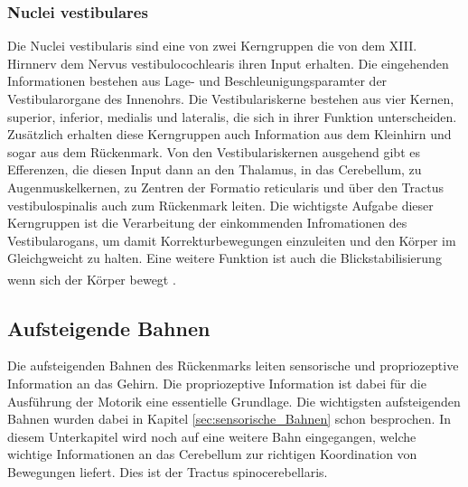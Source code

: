 \documentclass[12pt,a4paper,pdftex]{article}
\begin{document}
\subsubsection*{Nuclei vestibulares} 
Die Nuclei vestibularis sind eine von zwei Kerngruppen die von dem XIII. Hirnnerv dem Nervus vestibulocochlearis ihren Input erhalten. Die eingehenden Informationen bestehen aus Lage- und Beschleunigungsparamter der Vestibularorgane des Innenohrs. Die Vestibulariskerne bestehen aus vier Kernen, superior, inferior, medialis und lateralis, die sich in ihrer Funktion unterscheiden. Zusätzlich erhalten diese Kerngruppen auch Information aus dem Kleinhirn und sogar aus dem Rückenmark. Von den Vestibulariskernen ausgehend gibt es Efferenzen, die diesen Input dann an den Thalamus, in das Cerebellum, zu Augenmuskelkernen, zu Zentren der Formatio reticularis und über den Tractus vestibulospinalis auch zum Rückenmark leiten. Die wichtigste Aufgabe dieser Kerngruppen ist die Verarbeitung der einkommenden Infromationen des Vestibularogans, um damit Korrekturbewegungen einzuleiten und den Körper im Gleichgweicht zu halten. Eine weitere Funktion ist auch die Blickstabilisierung wenn sich der Körper bewegt \textsuperscript{\cite[5]{trepel2011neuroanatomie}}.  


\subsection{Aufsteigende Bahnen}
Die aufsteigenden Bahnen des Rückenmarks leiten sensorische und propriozeptive Information an das Gehirn. Die propriozeptive Information ist dabei für die Ausführung der Motorik eine essentielle Grundlage. Die wichtigsten aufsteigenden Bahnen wurden dabei in Kapitel \ref{sec:sensorische_Bahnen} schon besprochen. In diesem Unterkapitel wird noch auf eine weitere Bahn eingegangen, welche wichtige Informationen an das Cerebellum zur richtigen Koordination von Bewegungen liefert. Dies ist der Tractus spinocerebellaris. 
\end{document}
